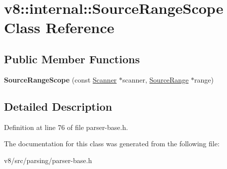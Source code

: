 \hypertarget{classv8_1_1internal_1_1SourceRangeScope}{}\section{v8\+:\+:internal\+:\+:Source\+Range\+Scope Class Reference}
\label{classv8_1_1internal_1_1SourceRangeScope}
\subsection*{Public Member Functions}
\begin{DoxyCompactItemize}
\item 
\mbox{\label{classv8_1_1internal_1_1SourceRangeScope_a07c8409b28a80aeee7b7e936504b2dc9}} 
{\bfseries Source\+Range\+Scope} (const \mbox{\hyperlink{classv8_1_1internal_1_1Scanner}{Scanner}} $\ast$scanner, \mbox{\hyperlink{structv8_1_1internal_1_1SourceRange}{Source\+Range}} $\ast$range)
\end{DoxyCompactItemize}


\subsection{Detailed Description}


Definition at line 76 of file parser-\/base.\+h.



The documentation for this class was generated from the following file\+:\begin{DoxyCompactItemize}
\item 
v8/src/parsing/parser-\/base.\+h\end{DoxyCompactItemize}

